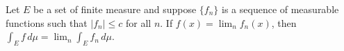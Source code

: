 Let $E$ be a set of finite measure and suppose $\{f_n\}$ is a sequence of measurable functions such that $|f_n| \leq c$ for all $n$. If $f(x) = \lim_n f_n(x)$, then $\int_E f \, d\mu = \lim_n \int_E f_n \, d\mu$.
